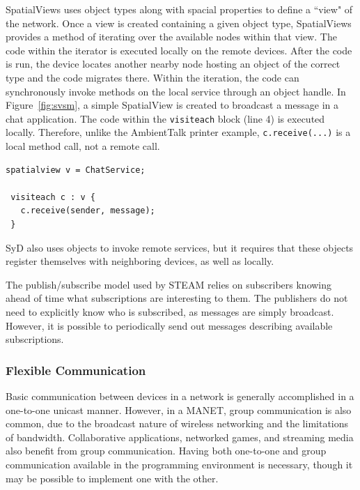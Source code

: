 SpatialViews uses object types along with spacial properties to define a ``view" of the network. Once a view is created containing a given object type, SpatialViews provides a method of iterating over the available nodes within that view. The code within the iterator is executed locally on the remote devices. After the code is run, the device locates another nearby node hosting an object of the correct type and the code migrates there. Within the iteration, the code can synchronously invoke methods on the local service through an object handle. In Figure~\ref{fig:svsm}, a simple SpatialView is created to broadcast a message in a chat application. The code within the \texttt{visiteach} block (line 4) is executed locally. Therefore, unlike the AmbientTalk printer example, \texttt{c.receive(...)} is a local method call, not a remote call.

\begin{lstlisting}[caption={Simple Messaging in SpatialViews}, label={fig:svsm}]
 spatialview v = ChatService;

 visiteach c : v {
   c.receive(sender, message);
 }
\end{lstlisting}

SyD also uses objects to invoke remote services, but it requires that these objects register themselves with neighboring devices, as well as locally. 

The publish/subscribe model used by STEAM relies on subscribers knowing ahead of time what subscriptions are interesting to them. The publishers do not need to explicitly know who is subscribed, as messages are simply broadcast. However, it is possible to periodically send out messages describing available subscriptions.

\subsubsection{Flexible Communication}

Basic communication between devices in a network is generally accomplished in a one-to-one unicast manner. However, in a MANET, group communication is also common, due to the broadcast nature of wireless networking and the limitations of bandwidth. Collaborative applications, networked games, and streaming media also benefit from group communication. Having both one-to-one and group communication available in the programming environment is necessary, though it may be possible to implement one with the other.

